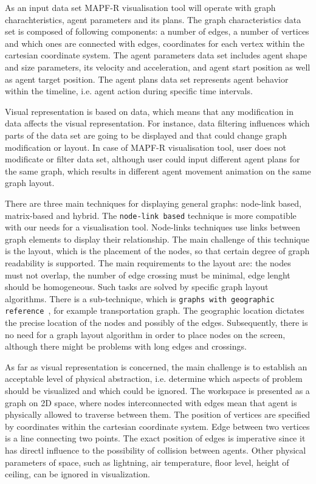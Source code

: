 \documentclass[thesis=B,english]{FITthesis}[2019/12/23]
\begin{document}
As an input data set MAPF-R visualisation tool will operate with graph charachteristics, agent parameters and its plans. The graph characteristics data set is composed of following components: a number of edges, a number of vertices and which ones are connected with edges, coordinates for each vertex within the cartesian coordinate system. The agent parameters data set includes agent shape and size parameters, its velocity and acceleration, and agent start position as well as agent target position. The agent plans data set represents agent behavior within the timeline, i.e. agent action during specific time intervals.     

Visual representation is based on data, which means that any modification in data affects the visual representation. For instance, data filtering influences which parts of the data set are going to be displayed and that could change graph modification or layout. In case of MAPF-R visualisation tool, user does not modificate or filter data set, although user could input different agent plans for the same graph, which results in different agent movement animation on the same graph layout. 

There are three main techniques for displaying general graphs: node-link based, matrix-based and hybrid. The \verb|node-link based| technique is more compatible with our needs for a visualisation tool. Node-links techniques use links between graph elements to display their relationship. The main challenge of this technique is the layout, which is the placement of the nodes, so that certain degree of graph readability is supported. The main requirements to the layout are: the nodes must not overlap, the number of edge crossing must be minimal, edge lenght should be homogeneous. Such tasks are solved by specific graph layout algorithms. There is a sub-technique, which is \verb|graphs with geographic reference |, for example transportation graph. The geographic location dictates the precise location of the nodes and possibly of the edges. Subsequently, there is no need for a graph layout algorithm in order to place nodes on the screen, although there might be problems with long edges and crossings.


As far as visual representation is concerned, the main challenge is to establish an acceptable level of physical abstraction, i.e. determine which aspects of problem should be visualized and which could be ignored. The workspace is presented as a graph on 2D space, where nodes interconnected with edges mean that agent is physically allowed to traverse between them. The position of vertices are specified by coordinates within the cartesian coordinate system. Edge between two vertices is a line connecting two points. The exact position of edges is imperative since it has directl influence to the possibility of collision between agents. Other physical parameters of space, such as lightning, air temperature, floor level, height of ceiling, can be ignored in visualization.
\end{document}
